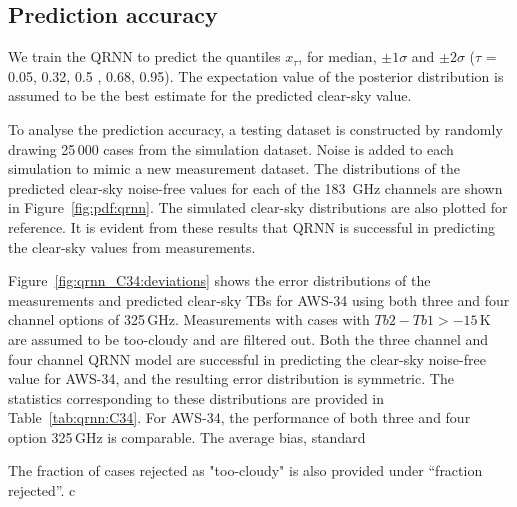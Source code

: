 \documentclass[12pt]{article}
\begin{document}
\subsection{Prediction accuracy}
%
We train the QRNN to predict the quantiles $x_{\tau}$, for median, $\pm 1\sigma$ and $\pm 2 \sigma$ ($\tau$ = 0.05, 0.32, 0.5 , 0.68, 0.95). The expectation value of the posterior distribution is assumed to be the best estimate for the predicted clear-sky value.

To analyse the prediction accuracy, a testing dataset is constructed by randomly drawing 25\,000 cases from the simulation dataset. Noise is added to each simulation to mimic a new measurement dataset. The distributions of the predicted clear-sky noise-free values for each of the 183\, GHz channels are shown in Figure~\ref{fig:pdf:qrnn}. The simulated clear-sky distributions are also plotted for reference. It is evident from these results that QRNN is successful in predicting the clear-sky values from measurements. 


Figure~\ref{fig:qrnn_C34:deviations} shows the error distributions of the measurements and predicted clear-sky TBs for AWS-34 using both three and four channel options of 325\,GHz. Measurements with cases with $Tb2 - Tb1 > -15$\,K are assumed to be too-cloudy and are filtered out. Both the three channel and four channel QRNN model are successful in predicting the clear-sky noise-free value for AWS-34, and the resulting error distribution is symmetric. The statistics corresponding to these distributions are provided in Table~\ref{tab:qrnn:C34}. For AWS-34, the performance of both three and four option 325\,GHz is comparable. The average bias, standard 


The fraction of cases rejected as "too-cloudy" is also provided under ``fraction rejected''. 
   c
  
\end{document}
